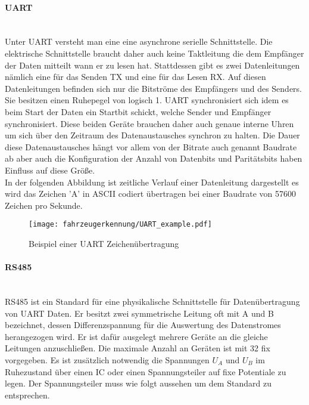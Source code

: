 \paragraph{UART}\mbox{}\\

Unter UART versteht man eine eine asynchrone serielle Schnittstelle. Die elektrische Schnittstelle braucht daher auch keine Taktleitung die dem Empfänger der Daten mitteilt wann er zu lesen hat. Stattdessen gibt es zwei Datenleitungen nämlich eine 
für das Senden TX und eine für das Lesen RX. Auf diesen Datenleitungen befinden sich nur die Bitströme des Empfängers und des Senders. Sie besitzen einen Ruhepegel von logisch 1.
UART synchronisiert sich idem es beim Start der Daten ein Startbit schickt, welche Sender und Empfänger synchronisiert. 
Diese beiden Geräte brauchen daher auch genaue interne Uhren um sich über den Zeitraum des Datenaustausches synchron zu halten.
Die Dauer diese Datenaustausches hängt vor allem von der Bitrate auch genannt Baudrate ab aber auch die Konfiguration der Anzahl von Datenbits und Paritätsbits haben Einfluss auf diese Größe. 
\\
In der folgenden Abbildung ist zeitliche Verlauf einer Datenleitung dargestellt es wird das Zeichen 'A' in ASCII codiert übertragen bei einer Baudrate von 57600 Zeichen pro Sekunde.

\begin{figure}[H]
    \centering
    \texttt{[image: fahrzeugerkennung/UART\_example.pdf]}
    \caption{Beispiel einer UART Zeichenübertragung}
\end{figure}

\paragraph{RS485}\mbox{}\\

RS485 ist ein Standard für eine physikalische Schnittstelle für Datenübertragung von UART Daten. Er besitzt zwei symmetrische Leitung oft mit A und B bezeichnet, dessen Differenzspannung für die Auswertung
des Datenstromes herangezogen wird. Er ist dafür ausgelegt mehrere Geräte an die gleiche Leitungen anzuschließen. Die maximale Anzahl an Geräten ist mit 32 fix vorgegeben. Es ist zusätzlich notwendig die Spannungen 
$U_{A}$ und $U_{B}$ im Ruhezustand über einen IC oder einen Spannungsteiler auf fixe Potentiale zu legen. Der Spannungsteiler muss wie folgt aussehen um dem Standard zu entsprechen.

